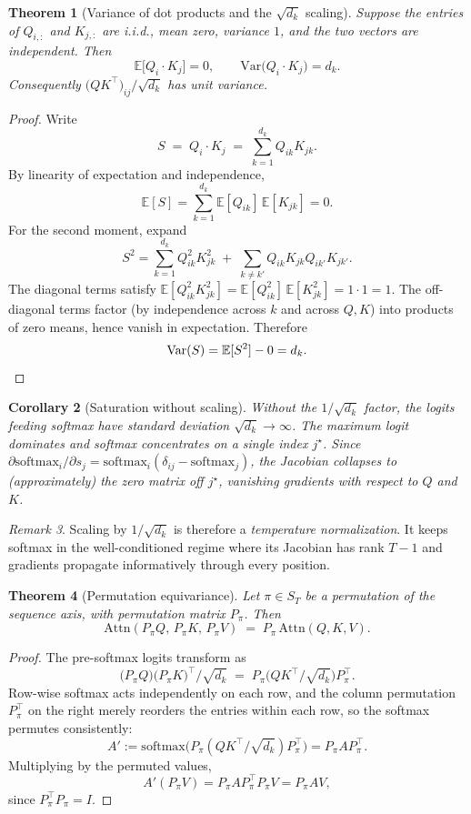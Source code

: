 \documentclass[11pt]{article}
\newtheorem{theorem}{Theorem}[section]
\newtheorem{corollary}[theorem]{Corollary}
\theoremstyle{remark}
\newtheorem{remark}[theorem]{Remark}
\begin{document}
\begin{theorem}[Variance of dot products and the $\sqrt{d_k}$ scaling]
\label{thm:variance}
Suppose the entries of $Q_{i,:}$ and $K_{j,:}$ are i.i.d., mean zero, variance $1$, and the two vectors are independent. Then
\[
\mathbb{E}\bigl[Q_i \cdot K_j\bigr] = 0, \qquad \mathrm{Var}\bigl(Q_i \cdot K_j\bigr) = d_k.
\]
Consequently $\bigl(QK^\top\bigr)_{ij}/\sqrt{d_k}$ has unit variance.
\end{theorem}
\begin{proof}
Write
\[
S \;=\; Q_i \cdot K_j \;=\; \sum_{k=1}^{d_k} Q_{ik} K_{jk}.
\]
By linearity of expectation and independence,
\[
\mathbb{E}[S] = \sum_{k=1}^{d_k} \mathbb{E}[Q_{ik}]\,\mathbb{E}[K_{jk}] = 0.
\]
For the second moment, expand
\[
S^2 = \sum_{k=1}^{d_k} Q_{ik}^2 K_{jk}^2 \;+\; \sum_{k \neq k'} Q_{ik} K_{jk} Q_{ik'} K_{jk'}.
\]
The diagonal terms satisfy $\mathbb{E}[Q_{ik}^2 K_{jk}^2] = \mathbb{E}[Q_{ik}^2]\,\mathbb{E}[K_{jk}^2] = 1\cdot 1 = 1$. The off-diagonal terms factor (by independence across $k$ and across $Q,K$) into products of zero means, hence vanish in expectation. Therefore
\[
\mathrm{Var}(S) = \mathbb{E}[S^2] - 0 = d_k. \qedhere
\]
\end{proof}

\begin{corollary}[Saturation without scaling]
Without the $1/\sqrt{d_k}$ factor, the logits feeding softmax have standard deviation $\sqrt{d_k} \to \infty$. The maximum logit dominates and softmax concentrates on a single index $j^\star$. Since $\partial \mathrm{softmax}_i/\partial s_j = \mathrm{softmax}_i(\delta_{ij} - \mathrm{softmax}_j)$, the Jacobian collapses to (approximately) the zero matrix off $j^\star$, vanishing gradients with respect to $Q$ and $K$.
\end{corollary}

\begin{remark}
Scaling by $1/\sqrt{d_k}$ is therefore a \emph{temperature normalization}. It keeps softmax in the well-conditioned regime where its Jacobian has rank $T-1$ and gradients propagate informatively through every position.
\end{remark}

\begin{theorem}[Permutation equivariance]
Let $\pi \in S_T$ be a permutation of the sequence axis, with permutation matrix $P_\pi$. Then
\[
\mathrm{Attn}(P_\pi Q,\, P_\pi K,\, P_\pi V) \;=\; P_\pi \, \mathrm{Attn}(Q, K, V).
\]
\end{theorem}
\begin{proof}
The pre-softmax logits transform as
\[
\bigl(P_\pi Q\bigr)\bigl(P_\pi K\bigr)^\top / \sqrt{d_k} \;=\; P_\pi \bigl(QK^\top / \sqrt{d_k}\bigr) P_\pi^\top.
\]
Row-wise softmax acts independently on each row, and the column permutation $P_\pi^\top$ on the right merely reorders the entries within each row, so the softmax permutes consistently:
\[
A' := \mathrm{softmax}\bigl(P_\pi (QK^\top/\sqrt{d_k}) P_\pi^\top\bigr) = P_\pi A P_\pi^\top.
\]
Multiplying by the permuted values,
\[
A' (P_\pi V) = P_\pi A P_\pi^\top P_\pi V = P_\pi A V,
\]
since $P_\pi^\top P_\pi = I$. \qedhere
\end{proof}
\end{document}
